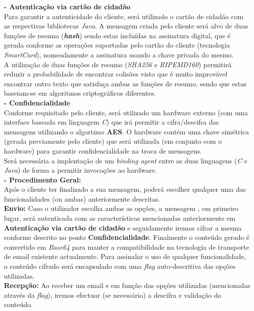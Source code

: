 \documentclass[times, 10pt,twocolumn]{article}
\begin{document}
\noindent \textbf{- Autentica\c{c}\~ao via cart\~ao de cidad\~ao}\\
\indent Para garantir a autenticidade do cliente, ser\'a utilizado o cart\~ao de cidad\~ao com as respectivas bibliotecas \emph{Java}. A mensagem criada pelo cliente ser\'a alvo de duas fun\c{c}\~oes de resumo (\textbf{\emph{hash}}) sendo estas inclu\'idas na assinatura digital, que \'e gerada conforme as opera\c{c}\~oes suportadas pelo cart\~ao do cliente (tecnologia \emph{SmartCard}), nomeadamente a assinatura usando a chave privada do mesmo. \\
\indent A utiliza\c{c}\~ao de duas fun\c{c}\~oes de resumo (\emph{SHA256} e \emph{RIPEMD160}) permitir\'a reduzir a probabilidade de encontrar colis\~oes visto que \'e muito improv\'avel encontrar outro texto que satisfa\c{c}a ambas as fun\c{c}\~oes de resumo, sendo que estas baseiam-se em algoritmos criptogr\'aficos diferentes.\\

\noindent \textbf{- Confidencialidade}\\
\indent Conforme requisitado pelo cliente, ser\'a utilizado um hardware externo (com uma interface baseada em linguagem \emph{C}) que ir\'a permitir a cifra/descifra das mensagens utilizando o algortimo \textbf{AES}. O hardware cont\'em uma chave sim\'etrica (gerada previamente pelo cliente) que ser\'a utilizada (em conjunto com o hardware) para garantir confidencialidade na troca de mensagens.\\
\indent Ser\'a necess\'aria a implenta\c{c}\~ao de um \emph{binding agent} entre as duas linguagens (\emph{C} e \emph{Java}) de forma a permitir invoca\c{c}\~oes ao hardware.\\

\noindent \textbf{- Procedimento Geral:} \\
\indent Ap\'os o cliente ter finalizado a sua mensagem, poder\'a escolher qualquer uma das funcionalidades (ou ambas) anteriormente descritas. \\
\indent \indent \textbf{Envio:} Caso o utilizador escolha ambas as op\c{c}\~oes, a mensagem , em primeiro lugar, ser\'a autenticada com as caracter\'isticas mencionadas anteriormente em \textbf{Autentica\c{c}\~ao via cart\~ao de cidad\~ao}  e seguidamente iremos cifrar a mesma conforme descrito no ponto \textbf{Confidencialidade}. Finalmente o conte\'udo gerado \'e convertido em \emph{Base64} para manter a compatibilidade na tecnologia de transporte de email existente actualmente. Para assinalar o uso de qualquer funcionalidade, o conte\'udo cifrado ser\'a encapsulado com uma \emph{flag} auto-descritiva das op\c{c}\~oes utilizadas.\\
\indent \indent \textbf{Recep\c{c}\~ao:} Ao receber um email e em fun\c{c}\~ao das op\c{c}\~oes utilizadas (mencionadas atrav\'es da \emph{flag}), iremos efectuar (se necess\'ario) a descifra e valida\c{c}\~ao do conte\'udo.
\end{document}
